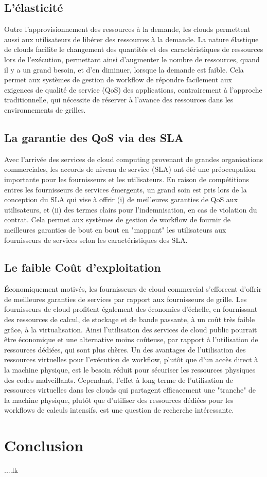 \subsection{L’élasticité}
Outre l’approvisionnement des ressources à la demande, les clouds permettent aussi aux utilisateurs de libérer des ressources à la demande. La nature élastique de clouds facilite le changement des quantités et des caractéristiques de ressources lors de l'exécution, permettant ainsi d’augmenter le nombre de ressources, quand il y a un grand besoin, et d’en diminuer, lorsque la demande est faible. Cela permet aux systèmes de gestion de workflow de répondre facilement aux exigences de qualité de service (QoS) des applications, contrairement à l'approche traditionnelle, qui nécessite de réserver à l'avance des ressources dans les environnements de grilles. 
\subsection{La garantie des QoS via des SLA }
Avec l’arrivée des services de cloud computing  provenant de grandes organisations commerciales, les accords de niveau de service (SLA) ont été une préoccupation importante pour les fournisseurs et les utilisateurs. En raison de compétitions entres les fournisseurs de services émergents, un grand soin est pris lors de la conception du SLA qui vise à offrir (i) de meilleures garanties de QoS aux utilisateurs, et (ii) des termes clairs pour l'indemnisation, en cas de violation du contrat. Cela permet aux systèmes de gestion de workflow de fournir de meilleures garanties de bout en bout en "mappant" les utilisateurs aux fournisseurs de services selon les caractéristiques des SLA.

\subsection{Le faible Coût d’exploitation }
 Économiquement motivés, les fournisseurs de cloud commercial s'efforcent d'offrir de meilleures garanties de services par rapport aux fournisseurs de grille. Les fournisseurs de cloud profitent également des économies d'échelle, en fournissant des ressources de calcul, de stockage et de bande passante, à un coût très faible grâce, à la virtualisation. Ainsi l'utilisation des services de cloud public pourrait être économique et une alternative moins coûteuse, par rapport à l’utilisation de ressources dédiées, qui sont plus chères. Un des avantages de l'utilisation des ressources virtuelles pour l'exécution de workflow, plutôt que d'un accès direct à la machine physique, est le besoin réduit pour sécuriser les ressources physiques des codes malveillants. Cependant, l'effet à long terme de l'utilisation de ressources virtuelles dans les clouds qui partagent efficacement une "tranche" de la machine physique, plutôt que d'utiliser des ressources dédiées pour les workflows de calculs intensifs, est une question de recherche intéressante. 
\section{Conclusion}
....lk
